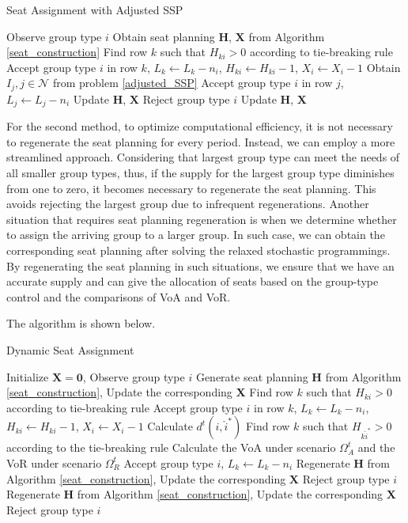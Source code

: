 \begin{algorithm}[H]
  \caption{Seat Assignment with Adjusted SSP}
  {Observe group type $i$\;
   {Obtain seat planning $\bm{H}$, $\bm{X}$ from Algorithm \ref{seat_construction}}
    {Find row $k$ such that $H_{ki} >0$ according to tie-breaking rule\; 
    Accept group type $i$ in row $k$, $L_{k} \gets L_{k} -n_{i}$, $H_{ki} \gets H_{ki} -1$, $X_{i} \gets X_{i} -1$}
    {{Obtain $I_{j}, j \in \mathcal{N}$ from problem \eqref{adjusted_SSP}\;
    {Accept group type $i$ in row $j$, $L_{j} \gets L_{j} - n_{i}$\; 
    Update $\bm{H}$, $\bm{X}$\;}
    {Reject group type $i$\; 
    Update $\bm{H}$, $\bm{X}$\;}}
    }}
\end{algorithm}


For the second method, to optimize computational efficiency, it is not necessary to regenerate the seat planning for every period. Instead, we can employ a more streamlined approach. Considering that largest group type can meet the needs of all smaller group types, thus, if the supply for the largest group type diminishes from one to zero, it becomes necessary to regenerate the seat planning. This avoids rejecting the largest group due to infrequent regenerations. Another situation that requires seat planning regeneration is when we determine whether to assign the arriving group to a larger group. In such case, we can obtain the corresponding seat planning after solving the relaxed stochastic programmings. By regenerating the seat planning in such situations, we ensure that we have an accurate supply and can give the allocation of seats based on the group-type control and the comparisons of VoA and VoR.

The algorithm is shown below.

\begin{algorithm}[H]
  \caption{Dynamic Seat Assignment}
  {Initialize $\bm{X} = \bm{0}$, Observe group type $i$\;
   {Generate seat planning $\bm{H}$ from Algorithm \ref{seat_construction}, Update the corresponding $\bm{X}$}
    {Find row $k$ such that $H_{ki} >0$ according to tie-breaking rule\; 
    Accept group type $i$ in row $k$, $L_{k} \gets L_{k} -n_{i}$, $H_{ki} \gets H_{ki} -1$, $X_{i} \gets X_{i} -1$}
    {Calculate $d^{t}(i, \hat{i}^{*})$\;
    {Find row $k$ such that $H_{k \hat{i}^{*}} > 0$ according to the tie-breaking rule\; 
    Calculate the VoA under scenario $\Omega^{t}_{A}$ and the VoR under scenario $\Omega^{t}_{R}$\;
    {Accept group type $i$, $L_{k} \gets L_{k} - n_{i}$\; 
    Regenerate $\bm{H}$ from Algorithm \ref{seat_construction}, Update the corresponding $\bm{X}$\;}
    {Reject group type $i$\; 
    Regenerate $\bm{H}$ from Algorithm \ref{seat_construction}, Update the corresponding $\bm{X}$\;}}
    {Reject group type $i$\;}
    }}
\end{algorithm}